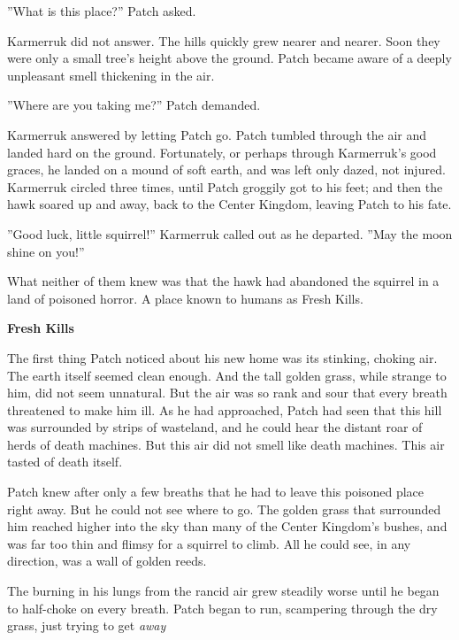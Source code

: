 \documentclass[11pt]{article}
\begin{document}
''What is this place?'' Patch asked.\par
Karmerruk did not answer. The hills quickly grew nearer and nearer. Soon they were only a small tree's height above the ground. Patch became aware of a deeply unpleasant smell thickening in the air.\par
 ''Where are you taking me?'' Patch demanded.\par
 Karmerruk answered by letting Patch go. Patch tumbled through the air and landed hard on the ground. Fortunately, or perhaps through Karmerruk's good graces, he landed on a mound of soft earth, and was left only dazed, not injured. Karmerruk circled three times, until Patch groggily got to his feet; and then the hawk soared up and away, back to the Center Kingdom, leaving Patch to his fate.\par
 ''Good luck, little squirrel!'' Karmerruk called out as he departed. ''May the moon shine on you!''\par
What neither of them knew was that the hawk had abandoned the squirrel in a land of poisoned horror. A place known to humans as Fresh Kills.\par
{}\par
{\bf Fresh Kills\par
}\par
 The first thing Patch noticed about his new home was its stinking, choking air. The earth itself seemed clean enough. And the tall golden grass, while strange to him, did not seem unnatural. But the air was so rank and sour that every breath threatened to make him ill. As he had approached, Patch had seen that this hill was surrounded by strips of wasteland, and he could hear the distant roar of herds of death machines. But this air did not smell like death machines. This air tasted of death itself.\par
 Patch knew after only a few breaths that he had to leave this poisoned place right away. But he could not see where to go. The golden grass that surrounded him reached higher into the sky than many of the Center Kingdom's bushes, and was far too thin and flimsy for a squirrel to climb. All he could see, in any direction, was a wall of golden reeds. \par
 The burning in his lungs from the rancid air grew steadily worse until he began to half-choke on every breath. Patch began to run, scampering through the dry grass, just trying to get {\it away} %
\end{document}
